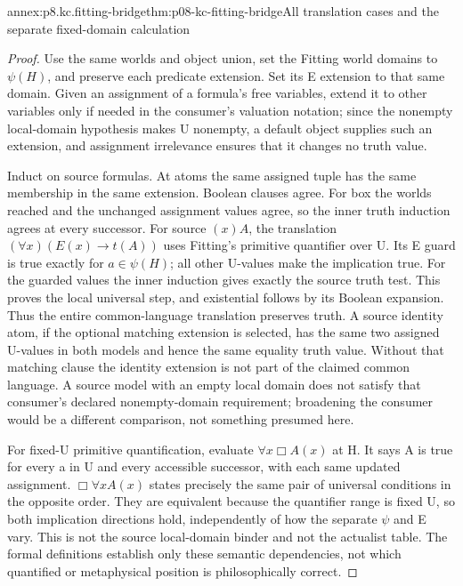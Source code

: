 \begin{annexitem}{annex:p8.kc.fitting-bridge}{thm:p08-kc-fitting-bridge}{All translation cases and the separate fixed-domain calculation}
\begin{proof}
Use the same worlds and object union, set the Fitting world
domains to \(\psi(H)\), and preserve each predicate extension.
Set its E extension to that same domain. Given an assignment
of a formula's free variables, extend it to other variables
only if needed in the consumer's valuation notation; since
the nonempty local-domain hypothesis makes U nonempty, a
default object supplies such an extension, and assignment
irrelevance ensures that it changes no truth value.

Induct on source formulas. At atoms the same assigned tuple
has the same membership in the same extension. Boolean
clauses agree. For box the worlds reached and the unchanged
assignment values agree, so the inner truth induction agrees
at every successor. For source \((x)A\), the translation
\((\forall x)(E(x)\to t(A))\) uses Fitting's primitive
quantifier over U. Its E guard is true exactly for
\(a\in\psi(H)\); all other U-values make the implication
true. For the guarded values the inner induction gives exactly
the source truth test. This proves the local universal step,
and existential follows by its Boolean expansion. Thus the
entire common-language translation preserves truth. A source
identity atom, if the optional matching extension is selected,
has the same two assigned U-values in both models and hence the
same equality truth value. Without that matching clause the
identity extension is not part of the claimed common language.
A source
model with an empty local domain does not satisfy that consumer's
declared nonempty-domain requirement; broadening the consumer
would be a different comparison, not something presumed here.

For fixed-U primitive quantification, evaluate
\(\forall x\Box A(x)\) at H. It says A is true for
every a in U and every accessible successor, with each same
updated assignment. \(\Box\forall xA(x)\) states precisely
the same pair of universal conditions in the opposite order.
They are equivalent because the quantifier range is fixed U,
so both implication directions hold, independently of how
the separate \(\psi\) and E vary. This is not the source
local-domain binder and not the actualist table. The formal
definitions establish only these semantic dependencies, not
which quantified or metaphysical position is philosophically correct.
\end{proof}
\end{annexitem}

